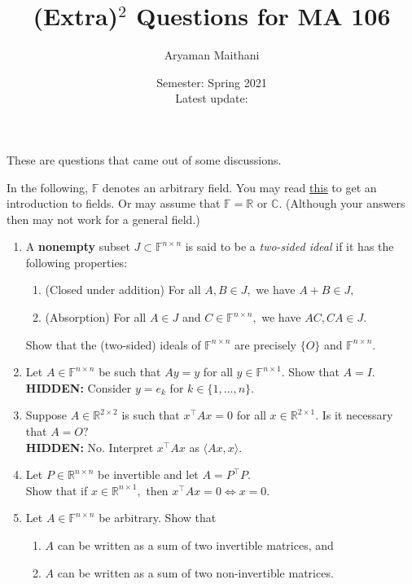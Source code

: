 \documentclass[12pt]{article}
\title{(Extra)\texorpdfstring{$^2$}{2} Questions for MA 106}
\author{Aryaman Maithani}%
\date{Semester: Spring 2021\\ Latest update: \DTMnow}
\newcommand{\hint}[1]{\textbf{HIDDEN:} {\color[rgb]{0.95, 0.95, 0.95}#1}}
\begin{document}
\maketitle

These are questions that came out of some discussions.

In the following, $\mathbb{F}$ denotes an arbitrary field. You may read \href{https://aryamanmaithani.github.io/ma-106-2021-tut/fields-and-vector-spaces.pdf}{this} to get an introduction to fields. Or may assume that $\mathbb{F} = \mathbb{R}$ or $\mathbb{C}.$ (Although your answers then may not work for a general field.)

\begin{enumerate}[leftmargin=*]
	\item A \textbf{nonempty} subset $J \subset \mathbb{F}^{n \times n}$ is said to be a \emph{two-sided ideal} if it has the following properties:
	\begin{enumerate}
		\item (Closed under addition) For all $A, B \in J,$ we have $A + B \in J,$
		\item (Absorption) For all $A \in J$ and $C \in \mathbb{F}^{n \times n},$ we have $AC, CA \in J.$
	\end{enumerate}
	Show that the (two-sided) ideals of $\mathbb{F}^{n \times n}$ are precisely $\{O\}$ and $\mathbb{F}^{n \times n}.$
	\item Let $A \in \mathbb{F}^{n \times n}$ be such that $Ay = y$ for all $y \in \mathbb{F}^{n \times 1}.$ Show that $A = I.$\\
	\hint{Consider $y = e_k$ for $k \in \{1, \ldots, n\}.$}
	\item Suppose $A \in \mathbb{R}^{2 \times 2}$ is such that $x^\top Ax = 0$ for all $x \in \mathbb{R}^{2 \times 1}.$ Is it necessary that $A = O?$\\
	\hint{No. Interpret $x^\top Ax$ as $\langle Ax, x\rangle.$}
	\item Let $P \in \mathbb{R}^{n \times n}$ be invertible and let $A = P^{\top}P.$ \\
	Show that if $x \in \mathbb{R}^{n \times 1},$ then $x^\top Ax = 0 \iff x = 0.$
	\item Let $A \in \mathbb{F}^{n \times n}$ be arbitrary. Show that
	\begin{enumerate}
		\item $A$ can be written as a sum of two invertible matrices, and
		\item $A$ can be written as a sum of two non-invertible matrices.
	\end{enumerate}
\end{enumerate}
\end{document}
